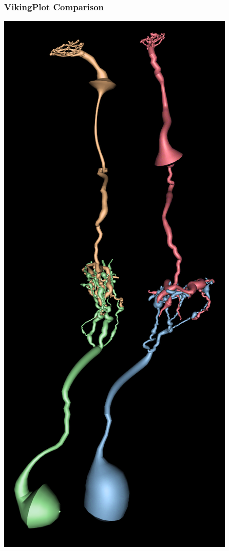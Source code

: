 \documentclass[11pt]{beamer}
\begin{document}
\begin{frame}
	\frametitle{VikingPlot Comparison}
	\begin{center}
		\includegraphics[height=0.7\textheight]{midgetBCGC}

\end{center}
\end{frame}
\end{document}
